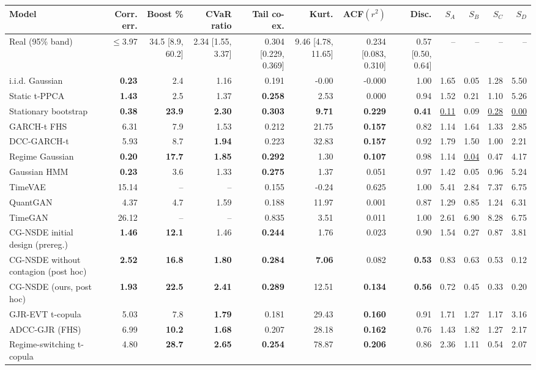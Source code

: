 \begin{tabular}{lrrrrrrrrrrr}
\toprule
Model & Corr. err. & Boost \% & CVaR ratio & Tail co-ex. & Kurt. & ACF$(r^2)$ & Disc. & $S_A$ & $S_B$ & $S_C$ & $S_D$ \\
\midrule
Real (95\% band) & $\le$3.97 & 34.5 [8.9, 60.2] & 2.34 [1.55, 3.37] & 0.304 [0.229, 0.369] & 9.46 [4.78, 11.65] & 0.234 [0.083, 0.310] & 0.57 [0.50, 0.64] & -- & -- & -- & -- \\
\midrule
i.i.d. Gaussian & \textbf{0.23} & 2.4 & 1.16 & 0.191 & -0.00 & -0.000 & 1.00 & 1.65 & 0.05 & 1.28 & 5.50 \\
Static t-PPCA & \textbf{1.43} & 2.5 & 1.37 & \textbf{0.258} & 2.53 & 0.000 & 0.94 & 1.52 & 0.21 & 1.10 & 5.26 \\
Stationary bootstrap & \textbf{0.38} & \textbf{23.9} & \textbf{2.30} & \textbf{0.303} & \textbf{9.71} & \textbf{0.229} & \textbf{0.41} & \underline{0.11} & 0.09 & \underline{0.28} & \underline{0.00} \\
GARCH-t FHS & 6.31 & 7.9 & 1.53 & 0.212 & 21.75 & \textbf{0.157} & 0.82 & 1.14 & 1.64 & 1.33 & 2.85 \\
DCC-GARCH-t & 5.93 & 8.7 & \textbf{1.94} & 0.223 & 32.83 & \textbf{0.157} & 0.92 & 1.79 & 1.50 & 1.00 & 2.21 \\
Regime Gaussian & \textbf{0.20} & \textbf{17.7} & \textbf{1.85} & \textbf{0.292} & 1.30 & \textbf{0.107} & 0.98 & 1.14 & \underline{0.04} & 0.47 & 4.17 \\
Gaussian HMM & \textbf{0.23} & 3.6 & 1.33 & \textbf{0.275} & 1.37 & 0.051 & 0.97 & 1.42 & 0.05 & 0.96 & 5.24 \\
TimeVAE & 15.14 & -- & -- & 0.155 & -0.24 & 0.625 & 1.00 & 5.41 & 2.84 & 7.37 & 6.75 \\
QuantGAN & 4.37 & 4.7 & 1.59 & 0.188 & 11.97 & 0.001 & 0.87 & 1.29 & 0.85 & 1.24 & 6.31 \\
TimeGAN & 26.12 & -- & -- & 0.835 & 3.51 & 0.011 & 1.00 & 2.61 & 6.90 & 8.28 & 6.75 \\
CG-NSDE initial design (prereg.) & \textbf{1.46} & \textbf{12.1} & 1.46 & \textbf{0.244} & 1.76 & 0.023 & 0.90 & 1.54 & 0.27 & 0.87 & 3.81 \\
CG-NSDE without contagion (post hoc) & \textbf{2.52} & \textbf{16.8} & \textbf{1.80} & \textbf{0.284} & \textbf{7.06} & 0.082 & \textbf{0.53} & 0.83 & 0.63 & 0.53 & 0.12 \\
CG-NSDE (ours, post hoc) & \textbf{1.93} & \textbf{22.5} & \textbf{2.41} & \textbf{0.289} & 12.51 & \textbf{0.134} & \textbf{0.56} & 0.72 & 0.45 & 0.33 & 0.20 \\
GJR-EVT t-copula & 5.03 & 7.8 & \textbf{1.79} & 0.181 & 29.43 & \textbf{0.160} & 0.91 & 1.71 & 1.27 & 1.17 & 3.16 \\
ADCC-GJR (FHS) & 6.99 & \textbf{10.2} & \textbf{1.68} & 0.207 & 28.18 & \textbf{0.162} & 0.76 & 1.43 & 1.82 & 1.27 & 2.17 \\
Regime-switching t-copula & 4.80 & \textbf{28.7} & \textbf{2.65} & \textbf{0.254} & 78.87 & \textbf{0.206} & 0.86 & 2.36 & 1.11 & 0.54 & 2.07 \\
\bottomrule
\end{tabular}
